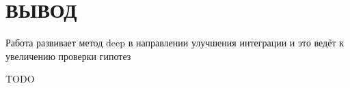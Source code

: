 \chapter*{ВЫВОД}

Работа развивает метод deep в направлении улучшения интеграции и это ведёт к увеличению проверки гипотез

TODO
